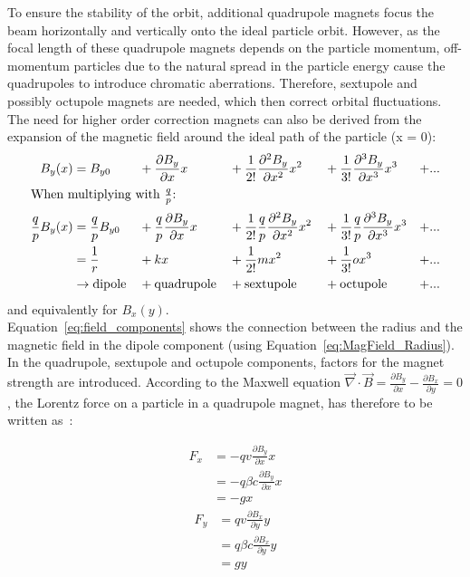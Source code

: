 To ensure the stability of the orbit, additional quadrupole magnets focus the beam horizontally and vertically onto the ideal particle orbit.
However, as the focal length of these quadrupole magnets depends on the particle momentum, off-momentum particles due to the natural spread in the particle energy cause the quadrupoles to introduce chromatic aberrations.
Therefore, sextupole and possibly octupole magnets are needed, which then correct orbital fluctuations.
The need for higher order correction magnets can also be derived from the expansion of the magnetic field around the ideal path of the particle (x = 0):
\begin{alignat}{5}
 B_y(x) &= B_{y0} &&+ \frac{\partial B_y}{\partial x}x &&+ \frac{1}{2!}\frac{\partial^2 B_y}{\partial x^2}x^2 &&+ \frac{1}{3!}\frac{\partial^3 B_y}{\partial x^3}x^3 &+ ...\\
 \intertext{When multiplying with $\frac{q}{p}$:}
 \frac{q}{p}B_y(x) &= \frac{q}{p}B_{y0} &&+ \frac{q}{p}\frac{\partial B_y}{\partial x}x &&+  \frac{1}{2!}\frac{q}{p}\frac{\partial^2 B_y}{\partial x^2}x^2 &&+ \frac{1}{3!}\frac{q}{p}\frac{\partial^3 B_y}{\partial x^3}x^3 &+ ...\\
  &= \frac{1}{r} &&+ kx &&+ \frac{1}{2!}mx^2 &&+ \frac{1}{3!}ox^3 &+ ... \label{eq:field_components}\\
  &\rightarrow \textnormal{dipole} &&+ \textnormal{quadrupole} &&+ \textnormal{sextupole} &&+ \textnormal{octupole} &+ ...\nonumber
\end{alignat}
and equivalently for $B_x(y)$.
\\Equation~\ref{eq:field_components} shows the connection between the radius and the magnetic field in the dipole component (using Equation~\ref{eq:MagField_Radius}).
In the quadrupole, sextupole and octupole components, factors for the magnet strength are introduced.
According to the Maxwell equation $\vec{\nabla}\cdot\vec{B} = \frac{\partial B_y}{\partial x} -\frac{\partial B_x}{\partial y} = 0$, the Lorentz force on a particle in a quadrupole magnet, has therefore to be written as~\cite[cf. p. 372]{VacuumElectronics}:
\begin{multicols}{2}
\noindent 
\begin{align}
 F_x &= -qv\frac{\partial B_y}{\partial x}x \nonumber\\
  &= -q\beta c\frac{\partial B_y}{\partial x}x\\
  &= -gx\label{eq:Quad_Lorentz_x}
\end{align}
\columnbreak
\begin{align}
 F_y &= qv\frac{\partial B_x}{\partial y}y\nonumber \\
  &= q\beta c\frac{\partial B_x}{\partial y}y\\
  &= gy \label{eq:Quad_Lorentz_y}
\end{align}
\end{multicols}
